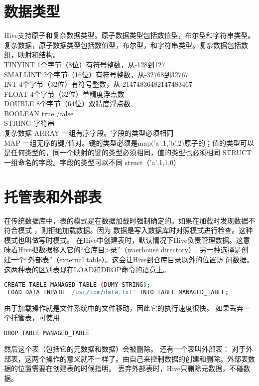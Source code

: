\documentclass[12pt]{article}
\begin{document}
\begin{CJK*}{UTF8}{gbsn}
\section{数据类型}
Hive支持原子和复杂数据类型。原子数据类型包括数值型，布尔型和字符串类型。复杂数据，原子数据类型包括数值型，布尔型，和字符串类型。复杂数据包括数组，映射和结构。\\
\indent TINYINT \quad  1个字节（8位）有符号整数，从-128到127 \\
\indent SMALLINT \quad  2个字节（16位）有符号整数，从-32768到32767\\
\indent INT  \quad 4个字节（32位）有符号整数，从-21474836482147483467
\\
\indent FLOAT \quad 4个字节（32位）单精度浮点数 \\
\indent DOUBLE \quad 8个字节（64位）双精度浮点数 \\
\indent BOOLEAN \quad  true /false  \\
\indent STRING \quad 字符串 \\
复杂数据
\indent ARRAY \quad  一组有序字段。字段的类型必须相同 \\
\indent MAP  \quad 一组无序的键/值对。键的类型必须是\quad map('a',1,'b',2)原子的；值的类型可以是任何类型的，同一个映射的键的类型必须相同，值的类型也必须相同
\indent STRUCT 一组命名的字段。字段的类型可以不同 struct（'a',1,1,0）
\section{托管表和外部表}
在传统数据库中，表的模式是在数据加载时强制确定的。如果在加载时发现数据不符合模式
，则拒绝加载数据。因为
数据是写入数据库时对照模式进行检查。这种模式也叫做写时模式。
在Hive中创建表时，默认情况下Hive负责管理数据。这意味着Hive把数据移入它的“仓库目>录”（waerhouse directory）.
另一种选择是创建一个“外部表”（external table）。这会让Hive到仓库目录以外的位置访
问数据。
这两种表的区别表现在LOAD和DROP命令的语意上。
\begin{lstlisting}[language=sh]
  CREATE TABLE MANAGED_TABLE (DUMY STRING);
 LOAD DATA INPATH '/usr/tom/data.txt' INTO TABLE MANAGED_TABLE;
\end{lstlisting}
  由于加载操作就是文件系统中的文件移动，因此它的执行速度很快。
  如果丢弃一个托管表，可使用
\begin{lstlisting}[language=sh]
  DROP TABLE MANAGED_TABLE
\end{lstlisting}
然后这个表（包括它的元数据和数据）会被删除。
还有一个表叫外部表： 对于外部表，这两个操作的意义就不一样了。由自己来控制数据的创建和删除。外部表数据的位置需要在创建表的时候指明。
丢弃外部表时，Hive只删除元数据，不碰数据。

\end{CJK*}
\end{document}
